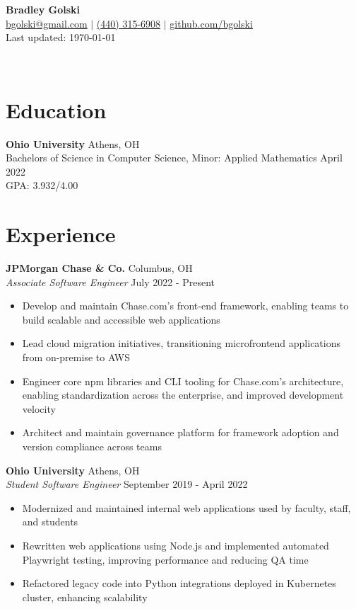 \documentclass[11pt,a4paper]{article}
\newcommand{\sectionspace}{\vspace{1mm}}
\begin{document}
\begin{center}
	\begin{minipage}[t]{0.7\textwidth}
		{\Huge \textbf{Bradley Golski}}\\[5pt]
		\href{mailto:bgolski@gmail.com}{bgolski@gmail.com} $|$
		\href{tel:+4403156908}{(440) 315-6908} $|$
		\href{https://github.com/bgolski}{github.com/bgolski}\\[2pt]
		{\small\color{gray}Last updated: \today}
	\end{minipage}%
	\begin{minipage}[t]{0.3\textwidth}
		\raggedleft
		\\[2pt]
	\end{minipage}
\end{center}
\vspace{0.5mm}

\section{Education}
\sectionspace
\textbf{Ohio University} \hfill Athens, OH\\
Bachelors of Science in Computer Science, Minor: Applied Mathematics \hfill April 2022\\
GPA: 3.932/4.00

\section{Experience}
\sectionspace
\textbf{JPMorgan Chase \& Co.} \hfill Columbus, OH\\
\textit{Associate Software Engineer} \hfill July 2022 - Present
\begin{itemize}
	\item Develop and maintain Chase.com's front-end framework, enabling teams to build scalable and accessible web applications
	\item Lead cloud migration initiatives, transitioning microfrontend applications from on-premise to AWS
	\item Engineer core npm libraries and CLI tooling for Chase.com's architecture, enabling standardization across
	      the enterprise, and improved development velocity
	\item Architect and maintain governance platform for framework adoption and version compliance across teams
\end{itemize}

\noindent \textbf{Ohio University} \hfill Athens, OH\\
\textit{Student Software Engineer} \hfill September 2019 - April 2022
\begin{itemize}
	\item Modernized and maintained internal web applications used by faculty, staff, and students
	\item Rewritten web applications using Node.js and implemented automated Playwright testing, improving performance and reducing QA time
	\item Refactored legacy code into Python integrations deployed in Kubernetes cluster, enhancing scalability
\end{itemize}
\end{document}
